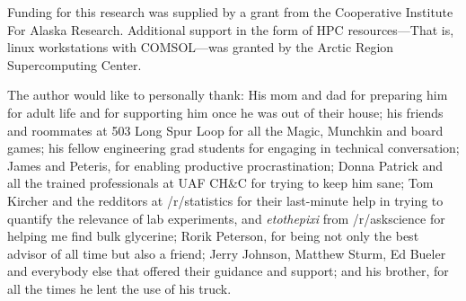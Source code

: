 Funding for this research was supplied by a grant from the Cooperative Institute
For Alaska Research. Additional support in the form of HPC resources---That is, 
linux workstations with COMSOL---was granted by the Arctic Region Supercomputing
Center.

The author would like to personally thank: His mom and dad for preparing him for
adult life and for supporting him once he was out of their house;
his friends and roommates at 503 Long Spur Loop for all the Magic, Munchkin and
board games;
his fellow engineering grad students for engaging in technical conversation;
James and Peteris, for enabling productive procrastination;
Donna Patrick and all the trained professionals at UAF CH\&C for trying to keep him sane;
Tom Kircher and the redditors at /r/statistics for their last-minute help in trying to quantify the relevance of lab experiments, and \textit{etothepixi} from /r/askscience for
helping me find bulk glycerine;
Rorik Peterson, for being not only the best advisor of all time but also a friend;
Jerry Johnson, Matthew Sturm, Ed Bueler and everybody else that offered their guidance and support; 
and his brother, for all the times he lent the use of his truck.
